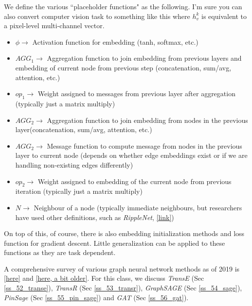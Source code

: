 We define the various ``placeholder functions" as the following. I'm sure you can also convert computer vision task to something like this where $h_v^k$ is equivalent to a pixel-level multi-channel vector. 

\begin{itemize}
    \item $\phi \rightarrow$ Activation function for embedding (tanh, softmax, etc.)
    
    \item $AGG_1 \rightarrow$ Aggregation function to join embedding from previous layers and embedding of current node from previous step (concatenation, sum/avg, attention, etc.)
    
    \item $op_1 \rightarrow$ Weight assigned to messages from previous layer after aggregation (typically just a matrix multiply)
    
    \item $AGG_2 \rightarrow$ Aggregation function to join embedding from nodes in the previous layer(concatenation, sum/avg, attention, etc.)
    
    \item $AGG_2 \rightarrow$ Message function to compute message from nodes in the previous layer to current node (depends on whether edge embeddings exist or if we are handling non-existing edges differently)
    
    \item $op_2 \rightarrow$ Weight assigned to embedding of the current node from previous iteration (typically just a matrix multiply)
    
    \item $N \rightarrow$ Neighbour of a node (typically immediate neighbours, but researchers have used other definitions, such as \textit{RippleNet}, \href{https://arxiv.org/pdf/1803.03467.pdf}{[link]})
\end{itemize}

On top of this, of course, there is also embedding initialization methods and loss function for gradient descent. Little generalization can be applied to these functions as they are task dependent.

A comprehensive survey of various graph neural network methods as of 2019 is \href{https://arxiv.org/pdf/1901.00596.pdf}{[here]} and \href{https://arxiv.org/pdf/1812.08434.pdf}{[here, a bit older]}. For this class, we discuss \textit{TransE} (Sec \ref{ss_52_transe}), \textit{TransR} (Sec \ref{ss_53_transr}), \textit{GraphSAGE} (Sec \ref{ss_54_sage}), \textit{PinSage} (Sec \ref{ss_55_pin_sage}) and \textit{GAT} (Sec \ref{ss_56_gat}).

